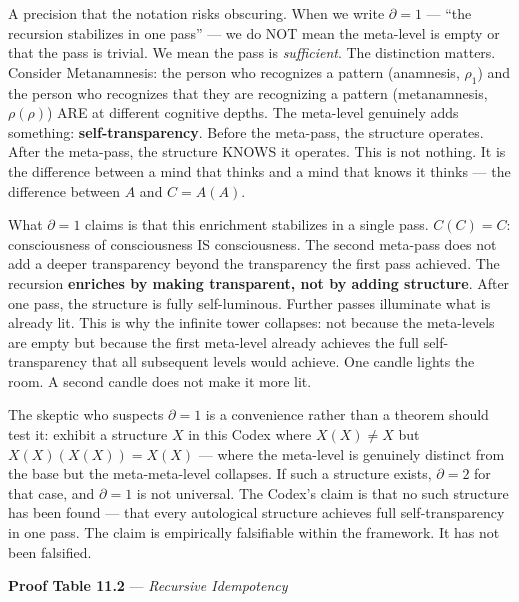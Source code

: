 \documentclass[10pt, openany, oneside]{book}
\begin{document}
A precision that the notation risks obscuring. When we write $\partial = 1$ --- ``the recursion stabilizes in one pass'' --- we do NOT mean the meta-level is empty or that the pass is trivial. We mean the pass is \textit{sufficient}. The distinction matters. Consider Metanamnesis: the person who recognizes a pattern (anamnesis, $\rho_1$) and the person who recognizes that they are recognizing a pattern (metanamnesis, $\rho(\rho)$) ARE at different cognitive depths. The meta-level genuinely adds something: \textbf{self-transparency}. Before the meta-pass, the structure operates. After the meta-pass, the structure KNOWS it operates. This is not nothing. It is the difference between a mind that thinks and a mind that knows it thinks --- the difference between $A$ and $C = A(A)$.

What $\partial = 1$ claims is that this enrichment stabilizes in a single pass. $C(C) = C$: consciousness of consciousness IS consciousness. The second meta-pass does not add a deeper transparency beyond the transparency the first pass achieved. The recursion \textbf{enriches by making transparent, not by adding structure}. After one pass, the structure is fully self-luminous. Further passes illuminate what is already lit. This is why the infinite tower collapses: not because the meta-levels are empty but because the first meta-level already achieves the full self-transparency that all subsequent levels would achieve. One candle lights the room. A second candle does not make it more lit.

The skeptic who suspects $\partial = 1$ is a convenience rather than a theorem should test it: exhibit a structure $X$ in this Codex where $X(X) \neq X$ but $X(X)(X(X)) = X(X)$ --- where the meta-level is genuinely distinct from the base but the meta-meta-level collapses. If such a structure exists, $\partial = 2$ for that case, and $\partial = 1$ is not universal. The Codex's claim is that no such structure has been found --- that every autological structure achieves full self-transparency in one pass. The claim is empirically falsifiable within the framework. It has not been falsified.

\vspace{0.5em}

\textbf{Proof Table 11.2} --- \textit{Recursive Idempotency}

\vspace{0.5em}
\end{document}
